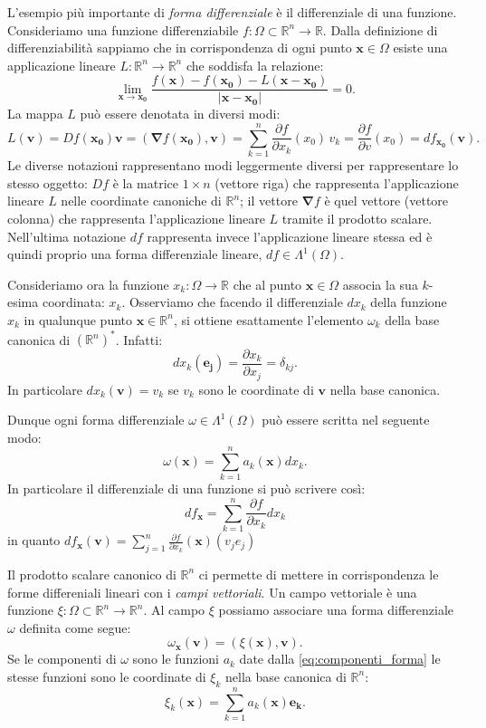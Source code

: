 \documentclass[italian,a4paper]{scrartcl}
\newcommand{\RR}{{\mathbb R}}
\renewcommand{\vec}{\mathbf}
\newcommand{\vecnabla}{\mathbf{\nabla}}
\begin{document}
L'esempio più importante di \emph{forma differenziale} è il
differenziale di una funzione.
Consideriamo una funzione differenziabile $f\colon \Omega\subset
\RR^n\to \RR$. Dalla definizione di differenziabilità sappiamo che in
corrispondenza di ogni punto $\vec x\in \Omega$ esiste una applicazione
lineare $L\colon \RR^n \to \RR^n$ che soddisfa la relazione:
\[
\lim_{\vec x\to \vec{x_0}} \frac{f(\vec x) - f(\vec{x_0}) - L(\vec
  x-\vec{x_0})}{\lvert \vec x-\vec{x_0}\rvert} = 0.
\]
La mappa $L$ può essere denotata in diversi modi:
\[
L (\vec v)
= Df(\vec{x_0}) \vec v
= (\vecnabla f(\vec{x_0}),\vec v)
= \sum_{k=1}^n \frac{\partial f}{\partial x_k}(x_0) \, v_k
= \frac{\partial f}{\partial v}(x_0)
= df_{\vec{x_0}}(\vec v).
\]
Le diverse notazioni rappresentano modi leggermente diversi per
rappresentare lo stesso oggetto: $Df$ è la matrice $1\times n$
(vettore riga) che
rappresenta l'applicazione lineare $L$ nelle coordinate canoniche di
$\RR^n$; il vettore $\vecnabla f$ è quel vettore (vettore colonna)
che rappresenta
l'applicazione lineare $L$ tramite il prodotto scalare. Nell'ultima
notazione $df$ rappresenta invece l'applicazione lineare stessa ed è
quindi proprio una forma differenziale lineare, $df\in \Lambda^1(\Omega)$.

Consideriamo ora la funzione $x_k\colon \Omega\to \RR$ che al punto
$\vec x\in \Omega$ associa la sua $k$-esima coordinata: $x_k$.
Osserviamo che facendo il differenziale $dx_k$ della funzione $x_k$ in
qualunque punto $\vec x \in \RR^n$,
si ottiene esattamente l'elemento $\omega_k$ della base canonica di
$(\RR^n)^*$. Infatti:
\[
dx_k(\vec{e_j}) = \frac{\partial x_k}{\partial x_j} = \delta_{kj}.
\]
In particolare $dx_k(\vec{v}) = v_k$ se $v_k$ sono le coordinate di
$\vec{v}$ nella base canonica.

Dunque ogni forma differenziale $\omega \in \Lambda^1(\Omega)$ può
essere scritta nel seguente modo:
\begin{equation}\label{eq:componenti_forma}
   \omega(\vec x) = \sum_{k=1}^n a_k(\vec x) dx_k.
\end{equation}
In particolare il differenziale di una funzione si può scrivere così:
\[
  df_{\vec x} = \sum_{k=1}^n \frac{\partial f}{\partial x_k} dx_k
\]
in quanto $df_{\vec x}(\vec v) = \sum_{j=1}^n \frac{\partial f}{\partial
  x_k}(\vec x)(v_j e_j)$

Il prodotto scalare canonico di $\RR^n$ ci permette di mettere in
corrispondenza le forme differeniali lineari con i \emph{campi
  vettoriali}.
Un campo vettoriale è una funzione $\xi \colon \Omega\subset \RR^n \to
\RR^n$. Al campo $\xi$ possiamo associare una forma differenziale
$\omega$ definita come segue:
\[
  \omega_{\vec x}(\vec v) = (\xi(\vec x),\vec v).
\]
Se le componenti di $\omega$ sono le funzioni $a_k$ date dalla
\eqref{eq:componenti_forma} le stesse funzioni sono le coordinate di
$\xi_k$ nella base canonica di $\RR^n$:
\[
  \xi_k(\vec x) = \sum_{k=1}^n a_k(\vec x) \vec{e_k}.
\]
\end{document}
